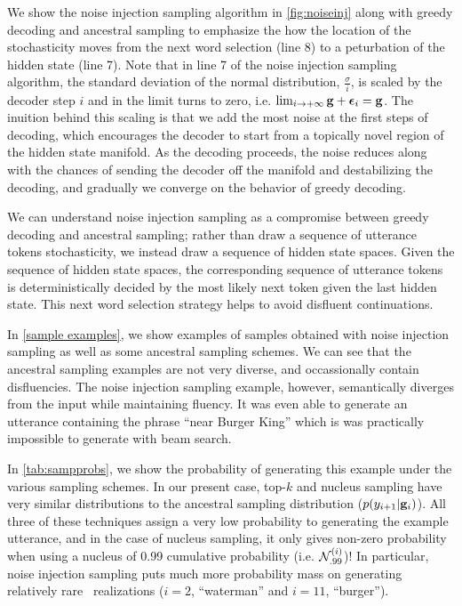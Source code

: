 We show the noise injection sampling algorithm in \autoref{fig:noiseinj}
along with greedy decoding and ancestral sampling to emphasize the 
how the location of the stochasticity moves from the next word selection (line 8) to a peturbation of the hidden state (line 7). 
Note that in line 7 of the noise injection sampling algorithm, the standard
deviation of the normal distribution, $\frac{\sigma}{i}$, is scaled by the 
decoder step $i$ and in the limit turns to zero, i.e. $\lim_{i \rightarrow +\infty} \mathbf{g} + \boldsymbol{\epsilon}_i = \mathbf{g}$. The inuition 
behind this scaling is that we add the most noise at the first steps 
of decoding, which encourages the decoder to start from a topically novel
region of the hidden state manifold. As the decoding proceeds, the noise
reduces along with the chances of sending the decoder off the manifold
and destabilizing the decoding, and gradually we converge on the behavior of
greedy decoding. 



We can understand noise injection sampling as a compromise between
greedy decoding and ancestral sampling; rather than draw a sequence of utterance
tokens stochasticity, we instead draw a sequence of hidden state spaces.
Given the sequence of hidden state spaces, the corresponding sequence of
utterance tokens is deterministically decided by the most likely next token
given the last hidden state. This next word selection strategy helps to
avoid disfluent continuations.


In \autoref{sample examples}, we show examples of samples obtained with
noise injection sampling as well as some ancestral sampling schemes.
We can see that the ancestral sampling examples are not very diverse,
and occassionally contain disfluencies. The noise injection sampling
example, however, semantically diverges from the input while maintaining
fluency. It was even able to generate an utterance containing the phrase
``near Burger King'' which is was practically impossible to generate with
beam search.


In \autoref{tab:sampprobs}, we show the probability of generating this example
under the various sampling schemes. In our present case, top-$k$ and nucleus
sampling have very similar distributions to the ancestral sampling
distribution ($p(y_{i+1}|\mathbf{g}_i)$). All three of these 
techniques assign a very low probability to generating the example utterance,
and in the case of nucleus sampling, it only gives non-zero probability when
using a nucleus of 0.99 cumulative probability (i.e. ${\mathcal{N}}_{.99}^{(i)}$)!
In particular, noise injection sampling puts much more probability 
mass on generating relatively rare \attributevalue~realizations ($i=2$, ``waterman'' and $i=11$, ``burger'').








